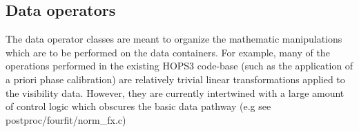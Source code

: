 \begin{center}
\end{center}



\subsection{Data operators}

The data operator classes are meant to organize the mathematic manipulations which are to be performed on the data containers. For example, many of the operations performed in the existing HOPS3 code-base (such as the application of a priori phase calibration) are relatively trivial linear transformations applied to the visibility data. However, they are currently intertwined with a large amount of control logic which obscures the basic data pathway (e.g see postproc/fourfit/norm\_fx.c)

